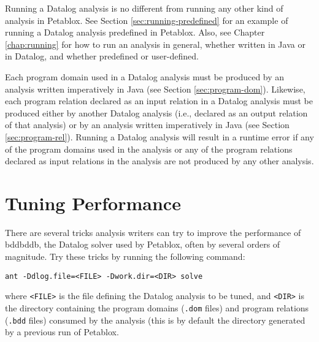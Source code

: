 Running a Datalog analysis is no different from running any other kind of
analysis in Petablox.  See Section \ref{sec:running-predefined} for an example of
running a Datalog analysis predefined in Petablox.  Also, see Chapter
\ref{chap:running} for how to run an analysis in general, whether written in
Java or in Datalog, and whether predefined or user-defined.

Each program domain used in a Datalog analysis must be
produced by an analysis written imperatively in Java (see Section
\ref{sec:program-dom}).
Likewise, each program relation declared as an input relation in a Datalog analysis must be
produced either by another Datalog analysis (i.e., declared as an output relation
of that analysis) or by an analysis written imperatively in Java (see Section
\ref{sec:program-rel}).
Running a Datalog analysis will result in a runtime error if any of the program
domains used in the analysis or any of the program relations declared as input
relations in the analysis are not produced by any other analysis.

\section{Tuning Performance}
\label{sec:tuning-datalog}

There are several tricks analysis writers can try to improve the
performance of bddbddb, the Datalog solver used by Petablox, often
by several orders of magnitude.
Try these tricks by running the following command:

\begin{framed}
\begin{verbatim}
ant -Ddlog.file=<FILE> -Dwork.dir=<DIR> solve
\end{verbatim}
\end{framed}

where {\tt <FILE>} is the file defining the Datalog analysis
to be tuned, and {\tt <DIR>} is the directory containing the
program domains ({\tt *.dom} files) and program relations ({\tt *.bdd} files)
consumed by the analysis (this is by default the
 directory generated
by a previous run of Petablox.

